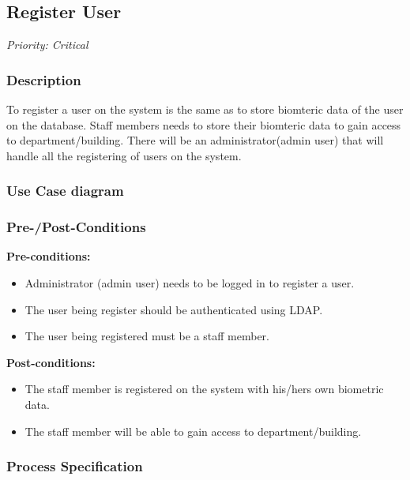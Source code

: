 \subsection{Register User}
\textit{Priority: Critical} \\

\subsubsection{Description}
To register a user on the system is the same as to store biomteric data of the user on the database.
Staff members needs to store their biomteric data to gain access to department/building. There will be an administrator(admin user) that will handle all the registering of users on the system.

\subsubsection{Use Case diagram}

\subsubsection{Pre-/Post-Conditions}
\textbf{Pre-conditions:} 
	\begin{itemize}
		\item Administrator (admin user) needs to be logged in to register a user.
		\item The user being register should be authenticated using LDAP. 
		\item The user being registered must be a staff member.
	\end{itemize}
\textbf{ Post-conditions:} 
	\begin{itemize}
		\item The staff member is registered on the system with his/hers own biometric data.
		\item The staff member will be able to gain access to department/building.
	\end{itemize}
	
\subsubsection{Process Specification}
